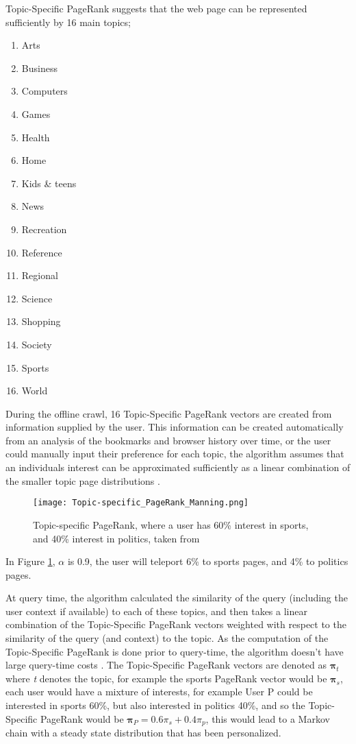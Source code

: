 \documentclass[11pt]{report}
\begin{document}
Topic-Specific PageRank suggests that the web page can be represented sufficiently by 16 main topics;
\begin{enumerate}
\item Arts
\item Business
\item Computers
\item Games
\item Health
\item Home
\item Kids \& teens
\item News
\item Recreation
\item Reference
\item Regional
\item Science
\item Shopping
\item Society
\item Sports
\item World
\end{enumerate} During the offline crawl, 16 Topic-Specific PageRank vectors are created from information supplied by the user. This information can be created automatically from an analysis of the bookmarks and browser history over time, or the user could manually input their preference for each topic, the algorithm assumes that an individuals interest can be approximated sufficiently as a linear combination of the smaller topic page distributions \cite{manning}.

\begin{figure}[h!]
\centering
\texttt{[image: Topic-specific\_PageRank\_Manning.png]}
\caption{Topic-specific PageRank, where a user has 60\% interest in sports, and 40\% interest in politics, taken from \cite{manning}}
\label{fig:topic-specific}
\end{figure}

In Figure \ref{fig:topic-specific}, $\alpha$ is 0.9, the user will teleport 6\% to sports pages, and 4\% to politics pages.

At query time, the algorithm calculated the similarity of the query (including the user context if available) to each of these topics, and then takes a linear combination of the Topic-Specific PageRank vectors weighted with respect to the similarity of the query (and context) to the topic. As the computation of the Topic-Specific PageRank is done prior to query-time, the algorithm doesn't have large query-time costs \cite{haveliwala2002topic}.  The Topic-Specific PageRank vectors are denoted as $\boldsymbol{\pi}_t$ where \textit{t} denotes the topic, for example the sports PageRank vector would be $\boldsymbol{\pi}_s$, each user would have a mixture of interests, for example User P could be interested in sports 60\%, but also interested in politics 40\%, and so the Topic-Specific PageRank would be $\boldsymbol{\pi}_P=0.6\pi_s+0.4\pi_p$, this would lead to a Markov chain with a steady state distribution that has been personalized. 
\end{document}
